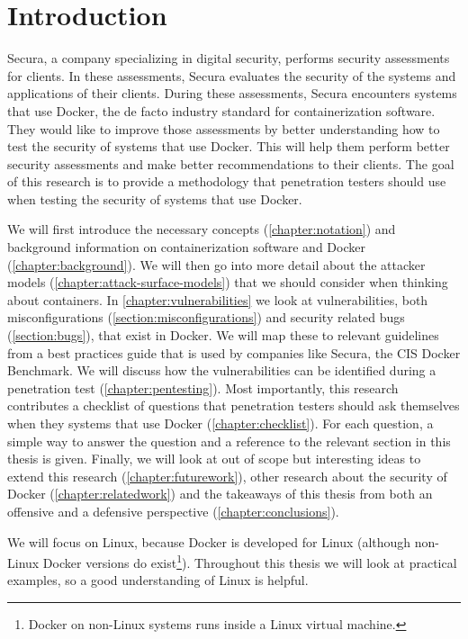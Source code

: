 \chapter{Introduction}
Secura, a company specializing in digital security, performs security assessments for clients. In these assessments, Secura evaluates the security of the systems and applications of their clients. During these assessments, Secura encounters systems that use Docker, the de facto industry standard for containerization software. They would like to improve those assessments by better understanding how to test the security of systems that use Docker. This will help them perform better security assessments and make better recommendations to their clients. The goal of this research is to provide a methodology that penetration testers should use when testing the security of systems that use Docker.

\medskip

We will first introduce the necessary concepts (\autoref{chapter:notation}) and background information on containerization software and Docker (\autoref{chapter:background}). We will then go into more detail about the attacker models (\autoref{chapter:attack-surface-models}) that we should consider when thinking about containers. In \autoref{chapter:vulnerabilities} we look at vulnerabilities, both misconfigurations (\autoref{section:misconfigurations}) and security related bugs (\autoref{section:bugs}), that exist in Docker. We will map these to relevant guidelines from a best practices guide that is used by companies like Secura, the CIS Docker Benchmark. We will discuss how the vulnerabilities can be identified during a penetration test (\autoref{chapter:pentesting}). Most importantly, this research contributes a checklist of questions that penetration testers should ask themselves when they systems that use Docker (\autoref{chapter:checklist}). For each question, a simple way to answer the question and a reference to the relevant section in this thesis is given. Finally, we will look at out of scope but interesting ideas to extend this research (\autoref{chapter:futurework}), other research about the security of Docker (\autoref{chapter:relatedwork}) and the takeaways of this thesis from both an offensive and a defensive perspective (\autoref{chapter:conclusions}).

We will focus on Linux, because Docker is developed for Linux (although non-Linux Docker versions do exist\footnote{Docker on non-Linux systems runs inside a Linux virtual machine.}). Throughout this thesis we will look at practical examples, so a good understanding of Linux is helpful.
